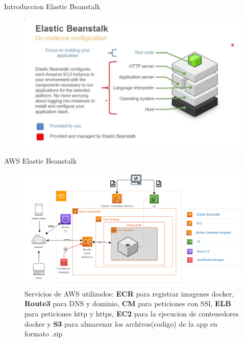 \documentclass[xcolor=pdftex,dvipsnames,table]{beamer}
\begin{document}
\begin{frame}{Introduccion Elastic Beanstalk}
    \begin{figure}[htb]
        \centering
        \captionsetup{justification=centering,margin=0.5cm}
        \includegraphics[width=1\linewidth]{implementacion/maxresdefault.jpg}
    \end{figure}   
\end{frame}
\begin{frame}{AWS Elastic Beanstalk}
    \begin{figure}[htb]
        \centering
        \captionsetup{justification=centering,margin=0.3cm}
        \includegraphics[width=1\linewidth]{implementacion/diagramAWS.png}
        \caption*{\footnotesize  Servicios de AWS utilizados:  \textbf{ECR} para registrar imagenes docker,  \textbf{Route3} para DNS y dominio,  \textbf{CM} para peticiones con SSl,  \textbf{ELB} para peticiones http y https,  \textbf{EC2} para la ejecucion de contenedores docker y  \textbf{S3} para almacenar los archivos(codigo) de la app en formato .zip   }
    \end{figure} 
\end{frame}
\end{document}

